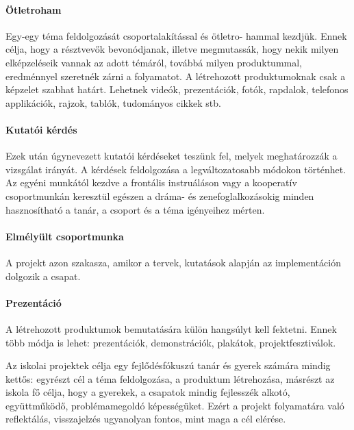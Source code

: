 \hypertarget{otletroham}{%
\paragraph{Ötletroham}\label{otletroham}}

Egy-egy téma feldolgozását csoportalakítással és öt\-let\-ro-\break
hammal kezdjük.
Ennek célja, hogy a résztvevők bevonódjanak, illetve megmutassák, hogy
nekik milyen elképzeléseik vannak az adott témáról, továbbá milyen
produktummal, eredménnyel szeretnék zárni a folyamatot. A létrehozott
produktumoknak csak a képzelet szabhat határt. Lehetnek videók,
prezentációk, fotók, rapdalok, telefonos applikációk, rajzok, tablók,
tudományos cikkek stb.

\hypertarget{kutatoi-kerdes}{%
\paragraph{Kutatói kérdés}\label{kutatoi-kerdes}}

Ezek után úgynevezett kutatói kérdéseket teszünk fel,\break
melyek
meghatározzák a vizsgálat irányát. A kérdések feldolgozása a
legváltozatosabb módokon történhet. Az egyéni munkától kezdve a frontális
instruáláson vagy a kooperatív csoportmunkán keresztül egészen a drá\-ma-
és zenefoglalkozásokig minden hasznosítható a tanár, a csoport és a téma
igényeihez mérten.

\hypertarget{elmelyult-csoportmunka}{%
\paragraph{Elmélyült csoportmunka}\label{elmelyult-csoportmunka}}

A projekt azon szakasza, amikor a tervek, kutatások alapján az
implementáción dolgozik a csapat.

\hypertarget{prezentacio}{%
\paragraph{Prezentáció}\label{prezentacio}}

A létrehozott produktumok bemutatására külön hangsúlyt kell fektetni.
Ennek több módja is lehet: prezentációk, demonstrációk, plakátok,
projektfesztiválok.

Az iskolai projektek célja egy fejlődésfókuszú tanár és gyerek számára
mindig kettős: egyrészt cél a téma feldolgozása, a produktum
létrehozása, másrészt az iskola fő célja, hogy a gyerekek, a csapatok
mindig fejlesszék alkotó, együttműködő, problémamegoldó képességüket.
Ezért a projekt folyamatára való reflektálás, visszajelzés ugyanolyan
fontos, mint maga a cél elérése.

